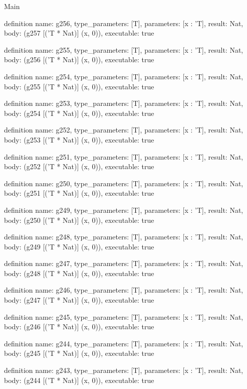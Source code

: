 \begin{lexlean}{Main}
\begin{semanticmodule}
definition{
  name: g256,
  type_parameters: [T],
  parameters: [x : 'T],
  result: Nat,
  body: (g257 [('T * Nat)] (x, 0)),
  executable: true
}

definition{
  name: g255,
  type_parameters: [T],
  parameters: [x : 'T],
  result: Nat,
  body: (g256 [('T * Nat)] (x, 0)),
  executable: true
}

definition{
  name: g254,
  type_parameters: [T],
  parameters: [x : 'T],
  result: Nat,
  body: (g255 [('T * Nat)] (x, 0)),
  executable: true
}

definition{
  name: g253,
  type_parameters: [T],
  parameters: [x : 'T],
  result: Nat,
  body: (g254 [('T * Nat)] (x, 0)),
  executable: true
}

definition{
  name: g252,
  type_parameters: [T],
  parameters: [x : 'T],
  result: Nat,
  body: (g253 [('T * Nat)] (x, 0)),
  executable: true
}

definition{
  name: g251,
  type_parameters: [T],
  parameters: [x : 'T],
  result: Nat,
  body: (g252 [('T * Nat)] (x, 0)),
  executable: true
}

definition{
  name: g250,
  type_parameters: [T],
  parameters: [x : 'T],
  result: Nat,
  body: (g251 [('T * Nat)] (x, 0)),
  executable: true
}

definition{
  name: g249,
  type_parameters: [T],
  parameters: [x : 'T],
  result: Nat,
  body: (g250 [('T * Nat)] (x, 0)),
  executable: true
}

definition{
  name: g248,
  type_parameters: [T],
  parameters: [x : 'T],
  result: Nat,
  body: (g249 [('T * Nat)] (x, 0)),
  executable: true
}

definition{
  name: g247,
  type_parameters: [T],
  parameters: [x : 'T],
  result: Nat,
  body: (g248 [('T * Nat)] (x, 0)),
  executable: true
}

definition{
  name: g246,
  type_parameters: [T],
  parameters: [x : 'T],
  result: Nat,
  body: (g247 [('T * Nat)] (x, 0)),
  executable: true
}

definition{
  name: g245,
  type_parameters: [T],
  parameters: [x : 'T],
  result: Nat,
  body: (g246 [('T * Nat)] (x, 0)),
  executable: true
}

definition{
  name: g244,
  type_parameters: [T],
  parameters: [x : 'T],
  result: Nat,
  body: (g245 [('T * Nat)] (x, 0)),
  executable: true
}

definition{
  name: g243,
  type_parameters: [T],
  parameters: [x : 'T],
  result: Nat,
  body: (g244 [('T * Nat)] (x, 0)),
  executable: true
}


\end{semanticmodule}
\end{lexlean}
